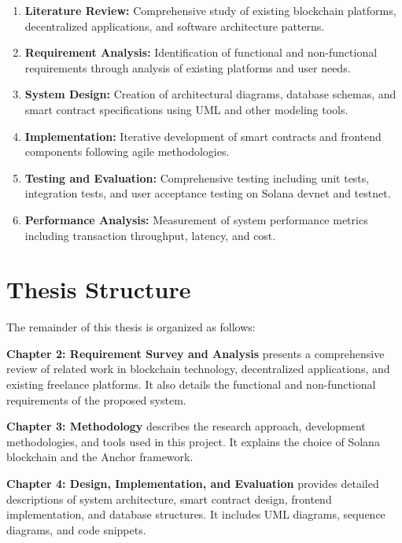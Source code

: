 \documentclass[a4paper,13pt,twoside]{report}
\theoremstyle{definition}
\begin{document}
\begin{enumerate}
    \item \textbf{Literature Review:} Comprehensive study of existing blockchain platforms, decentralized applications, and software architecture patterns.

    \item \textbf{Requirement Analysis:} Identification of functional and non-functional requirements through analysis of existing platforms and user needs.

    \item \textbf{System Design:} Creation of architectural diagrams, database schemas, and smart contract specifications using UML and other modeling tools.

    \item \textbf{Implementation:} Iterative development of smart contracts and frontend components following agile methodologies.

    \item \textbf{Testing and Evaluation:} Comprehensive testing including unit tests, integration tests, and user acceptance testing on Solana devnet and testnet.

    \item \textbf{Performance Analysis:} Measurement of system performance metrics including transaction throughput, latency, and cost.
\end{enumerate}

\section{Thesis Structure}

The remainder of this thesis is organized as follows:

\textbf{Chapter 2: Requirement Survey and Analysis} presents a comprehensive review of related work in blockchain technology, decentralized applications, and existing freelance platforms. It also details the functional and non-functional requirements of the proposed system.

\textbf{Chapter 3: Methodology} describes the research approach, development methodologies, and tools used in this project. It explains the choice of Solana blockchain and the Anchor framework.

\textbf{Chapter 4: Design, Implementation, and Evaluation} provides detailed descriptions of system architecture, smart contract design, frontend implementation, and database structures. It includes UML diagrams, sequence diagrams, and code snippets.
\end{document}
